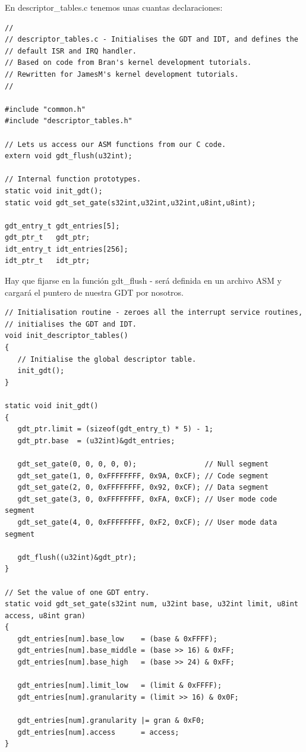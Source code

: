 \documentclass{report}
\begin{document}
En descriptor\_tables.c tenemos unas cuantas declaraciones:

\begin{lstlisting}
//
// descriptor_tables.c - Initialises the GDT and IDT, and defines the 
// default ISR and IRQ handler.
// Based on code from Bran's kernel development tutorials.
// Rewritten for JamesM's kernel development tutorials.
//

#include "common.h"
#include "descriptor_tables.h"

// Lets us access our ASM functions from our C code.
extern void gdt_flush(u32int);

// Internal function prototypes.
static void init_gdt();
static void gdt_set_gate(s32int,u32int,u32int,u8int,u8int);

gdt_entry_t gdt_entries[5];
gdt_ptr_t   gdt_ptr;
idt_entry_t idt_entries[256];
idt_ptr_t   idt_ptr;
\end{lstlisting}

Hay que fijarse en la función gdt\_flush - será definida en un archivo ASM y cargará el puntero de nuestra GDT por nosotros.

\begin{lstlisting}
// Initialisation routine - zeroes all the interrupt service routines,
// initialises the GDT and IDT.
void init_descriptor_tables()
{
   // Initialise the global descriptor table.
   init_gdt();
}

static void init_gdt()
{
   gdt_ptr.limit = (sizeof(gdt_entry_t) * 5) - 1;
   gdt_ptr.base  = (u32int)&gdt_entries;

   gdt_set_gate(0, 0, 0, 0, 0);                // Null segment
   gdt_set_gate(1, 0, 0xFFFFFFFF, 0x9A, 0xCF); // Code segment
   gdt_set_gate(2, 0, 0xFFFFFFFF, 0x92, 0xCF); // Data segment
   gdt_set_gate(3, 0, 0xFFFFFFFF, 0xFA, 0xCF); // User mode code segment
   gdt_set_gate(4, 0, 0xFFFFFFFF, 0xF2, 0xCF); // User mode data segment

   gdt_flush((u32int)&gdt_ptr);
}

// Set the value of one GDT entry.
static void gdt_set_gate(s32int num, u32int base, u32int limit, u8int access, u8int gran)
{
   gdt_entries[num].base_low    = (base & 0xFFFF);
   gdt_entries[num].base_middle = (base >> 16) & 0xFF;
   gdt_entries[num].base_high   = (base >> 24) & 0xFF;

   gdt_entries[num].limit_low   = (limit & 0xFFFF);
   gdt_entries[num].granularity = (limit >> 16) & 0x0F;

   gdt_entries[num].granularity |= gran & 0xF0;
   gdt_entries[num].access      = access;
}
\end{lstlisting}
\end{document}
